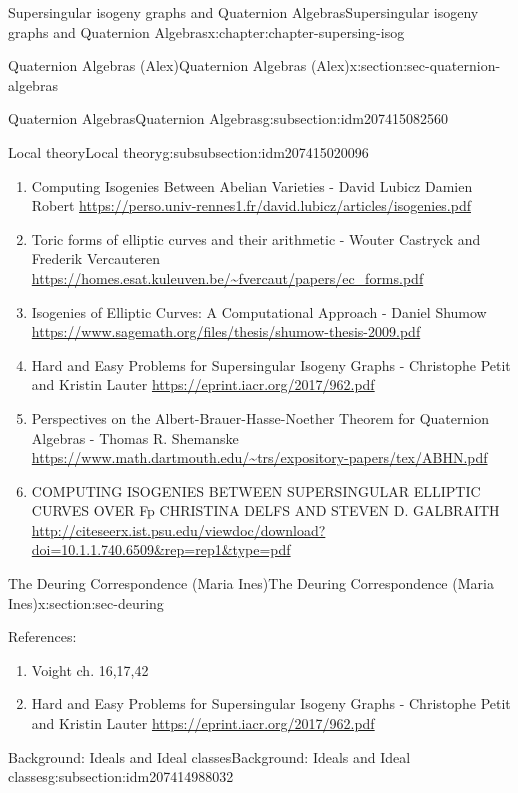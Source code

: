 \documentclass[oneside,10pt,]{book}
\numberwithin{equation}{section}
\begin{document}
\begin{chapterptx}{Supersingular isogeny graphs and Quaternion Algebras}{}{Supersingular isogeny graphs and Quaternion Algebras}{}{}{x:chapter:chapter-supersing-isog}
\begin{sectionptx}{Quaternion Algebras (Alex)}{}{Quaternion Algebras (Alex)}{}{}{x:section:sec-quaternion-algebras}
\begin{subsectionptx}{Quaternion Algebras}{}{Quaternion Algebras}{}{}{g:subsection:idm207415082560}
\begin{subsubsectionptx}{Local theory}{}{Local theory}{}{}{g:subsubsection:idm207415020096}
\begin{enumerate}
\item{}Computing Isogenies Between Abelian Varieties - David Lubicz Damien Robert \url{https://perso.univ-rennes1.fr/david.lubicz/articles/isogenies.pdf}%
\item{}Toric forms of elliptic curves and their arithmetic - Wouter Castryck and Frederik Vercauteren \url{https://homes.esat.kuleuven.be/\~fvercaut/papers/ec_forms.pdf}%
\item{}Isogenies of Elliptic Curves: A Computational Approach - Daniel Shumow \url{https://www.sagemath.org/files/thesis/shumow-thesis-2009.pdf}%
\item{}Hard and Easy Problems for Supersingular Isogeny Graphs - Christophe Petit and Kristin Lauter \url{https://eprint.iacr.org/2017/962.pdf}%
\item{}Perspectives on the Albert-Brauer-Hasse-Noether Theorem for Quaternion Algebras -  Thomas R. Shemanske \url{https://www.math.dartmouth.edu/\~trs/expository-papers/tex/ABHN.pdf}%
\item{}COMPUTING ISOGENIES BETWEEN SUPERSINGULAR ELLIPTIC CURVES OVER Fp CHRISTINA DELFS AND STEVEN D. GALBRAITH \url{http://citeseerx.ist.psu.edu/viewdoc/download?doi=10.1.1.740.6509\&rep=rep1\&type=pdf}%
\end{enumerate}
%
\end{subsubsectionptx}
\end{subsectionptx}
\end{sectionptx}
%
%
\typeout{************************************************}
\typeout{************************************************}
%
\begin{sectionptx}{The Deuring Correspondence (Maria Ines)}{}{The Deuring Correspondence (Maria Ines)}{}{}{x:section:sec-deuring}
\begin{introduction}{}%
References:%
\par
%
\begin{enumerate}
\item{}Voight ch. 16,17,42%
\item{}Hard and Easy Problems for Supersingular Isogeny Graphs - Christophe Petit and Kristin Lauter \url{https://eprint.iacr.org/2017/962.pdf}%
\end{enumerate}
%
\end{introduction}%
%
%
\typeout{************************************************}
\typeout{************************************************}
%
\begin{subsectionptx}{Background: Ideals and Ideal classes}{}{Background: Ideals and Ideal classes}{}{}{g:subsection:idm207414988032}

\end{subsectionptx}
\end{sectionptx}
\end{chapterptx}
\end{document}

